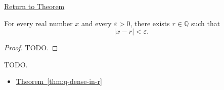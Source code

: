 \newpage
{}
\label{prf:rational-approximation}

\begin{remark*}[Return]
\hyperref[thm:rational-approximation]{Return to Theorem}
\end{remark*}

\begin{theorem*}
For every real number $x$ and every $\varepsilon>0$, there exists
$r\in\mathbb{Q}$ such that
\[
|x-r|<\varepsilon.
\]
\end{theorem*}

\begin{proof}
TODO.
\end{proof}

\begin{remark*}
TODO.
\end{remark*}

\begin{dependencies}
\begin{itemize}
  \item \hyperref[thm:q-dense-in-r]{Theorem~\ref*{thm:q-dense-in-r}}
\end{itemize}
\end{dependencies}

